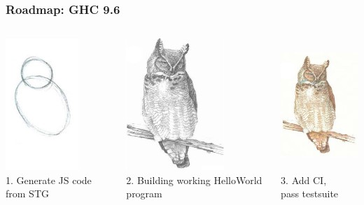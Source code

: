 \documentclass[aspectratio=169]{beamer}
\begin{document}
\begin{frame}
\frametitle{Roadmap: GHC 9.6}
\begin{columns}

\begin{column}{0.3\textwidth}
\begin{center}
\includegraphics[height=5cm]{images/owl0.png}\\
1. Generate JS code from STG
\end{center}
\end{column}

\begin{column}{0.3\textwidth}
\begin{center}
\includegraphics[height=5cm]{images/owl1.png}\\
2. Building working HelloWorld program
\end{center}
\end{column}

\begin{column}{0.3\textwidth}
\begin{center}
\includegraphics[height=5cm]{images/owl2.png}\\
3. Add CI,\\pass testsuite
\end{center}
\end{column}

\end{columns}
\end{frame}
\end{document}
